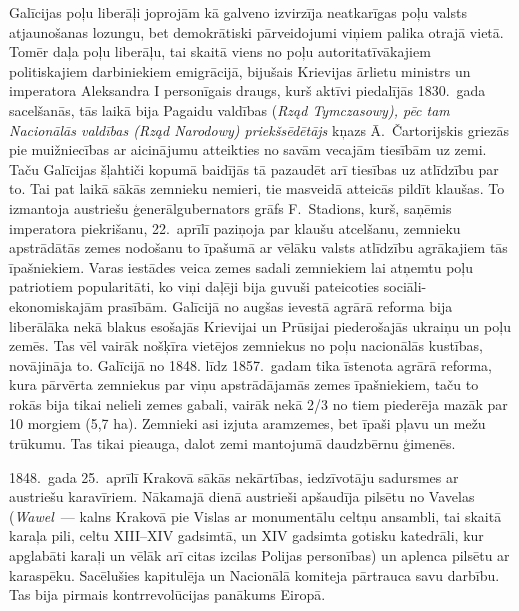 \documentclass[twoside,a5paper,12pt,fleqn,openany]{extbook}
\newcommand{\pltxti}[1]{\textit{\textpolish{#1}}}
\begin{document}
Galīcijas poļu liberāļi joprojām kā galveno izvirzīja neatkarīgas poļu valsts atjaunošanas lozungu, bet demokrātiski pārveidojumi viņiem palika otrajā vietā. Tomēr daļa poļu liberāļu, tai skaitā viens no poļu autoritatīvākajiem politiskajiem darbiniekiem emigrācijā, bijušais Krievijas ārlietu ministrs un imperatora Aleksandra I personīgais draugs, kurš aktīvi piedalījās 1830.~gada sacelšanās, tās laikā bija Pagaidu valdības (\pltxti{Rząd Tymczasowy), pēc tam Nacionālās valdības (Rząd Narodowy) priekšsēdētājs} kņazs Ā.~Čartorijskis griezās pie muižniecības ar aicinājumu atteikties no savām vecajām tiesībām uz zemi. Taču Galīcijas šļahtiči kopumā baidījās tā pazaudēt arī tiesības uz atlīdzību par to. Tai pat laikā sākās zemnieku nemieri, tie masveidā atteicās pildīt klaušas. To izmantoja austriešu ģenerālgubernators grāfs F.~Stadions, kurš, saņēmis imperatora piekrišanu, 22.~aprīlī paziņoja par klaušu atcelšanu, zemnieku apstrādātās zemes nodošanu to īpašumā ar vēlāku valsts atlīdzību agrākajiem tās īpašniekiem. Varas iestādes veica zemes sadali zemniekiem lai atņemtu poļu patriotiem popularitāti, ko viņi daļēji bija guvuši pateicoties sociāli-ekonomiskajām prasībām. Galīcijā no augšas ievestā agrārā reforma bija liberālāka nekā blakus esošajās Krievijai un Prūsijai piederošajās ukraiņu un poļu zemēs. Tas vēl vairāk nošķīra vietējos zemniekus no poļu nacionālās kustības, novājināja to. Galīcijā no 1848. līdz 1857.~gadam tika īstenota agrārā reforma, kura pārvērta zemniekus par viņu apstrādājamās zemes īpašniekiem, taču to rokās bija tikai nelieli zemes gabali, vairāk nekā 2/3 no tiem piederēja mazāk par 10 morgiem (5,7 ha). Zemnieki asi izjuta aramzemes, bet īpaši pļavu un mežu trūkumu. Tas tikai pieauga, dalot zemi mantojumā daudzbērnu ģimenēs.

1848.~gada 25.~aprīlī Krakovā sākās nekārtības, iedzīvotāju sadursmes ar austriešu karavīriem. Nākamajā dienā austrieši apšaudīja pilsētu no Vavelas (\pltxti{Wawel}~--- kalns Krakovā pie Vislas ar monumentālu celtņu ansambli, tai skaitā karaļa pili, celtu XIII--XIV gadsimtā, un XIV gadsimta gotisku katedrāli, kur apglabāti karaļi un vēlāk arī citas izcilas Polijas personības) un aplenca pilsētu ar karaspēku. Sacēlušies kapitulēja un Nacionālā komiteja pārtrauca savu darbību. Tas bija pirmais kontrrevolūcijas panākums Eiropā.
\end{document}
